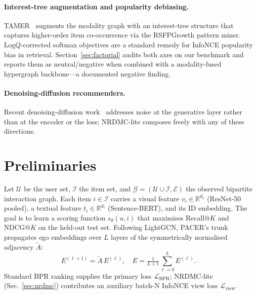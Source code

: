 \documentclass[conference]{IEEEtran}
\newcommand{\Lcal}{\mathcal{L}}
\newcommand{\Ucal}{\mathcal{U}}
\newcommand{\Ical}{\mathcal{I}}
\newcommand{\Ecal}{\mathcal{E}}
\begin{document}
\paragraph{Interest-tree augmentation and popularity debiasing.}
TAMER~\cite{meng2025tamer} augments the modality graph with an
interest-tree structure that captures higher-order item co-occurrence
via the RSFPGrowth pattern miner. Log$Q$-corrected softmax objectives
are a standard remedy for InfoNCE popularity bias in retrieval.
Section~\ref{sec:factorial} audits both axes on our benchmark and
reports them as neutral/negative when combined with a modality-fused
hypergraph backbone---a documented negative finding.

\paragraph{Denoising-diffusion recommenders.}
Recent denoising-diffusion
work~\cite{jiang2024diffmm,jiang2024diffkg,nguyen2024diffusion}
addresses noise at the generative layer rather than at the encoder or
the loss; NRDMC-lite composes freely with any of these directions.

\section{Preliminaries}
\label{sec:prelim}

Let $\Ucal$ be the user set, $\Ical$ the item set, and $\mathcal{G} =
(\Ucal \cup \Ical, \Ecal)$ the observed bipartite interaction graph.
Each item $i \in \Ical$ carries a visual feature
$v_i \in \mathbb{R}^{d_v}$ (ResNet-50 pooled), a textual feature
$t_i \in \mathbb{R}^{d_t}$ (Sentence-BERT), and its ID embedding.
The goal is to learn a scoring function $s_\theta(u, i)$ that
maximises Recall@$K$ and NDCG@$K$ on the held-out test set. Following
LightGCN, PACER's trunk propagates ego embeddings over $L$ layers of
the symmetrically normalised adjacency $\tilde A$:
\begin{equation}
E^{(\ell+1)} = \tilde A\, E^{(\ell)},\quad
E = \tfrac{1}{L+1} \sum_{\ell=0}^{L} E^{(\ell)}.
\label{eq:lightgcn}
\end{equation}
Standard BPR ranking supplies the primary loss $\Lcal_{\text{BPR}}$;
NRDMC-lite (Sec.~\ref{sec:nrdmc}) contributes an auxiliary batch-N
InfoNCE view loss $\Lcal_{\text{view}}$.

\end{document}
